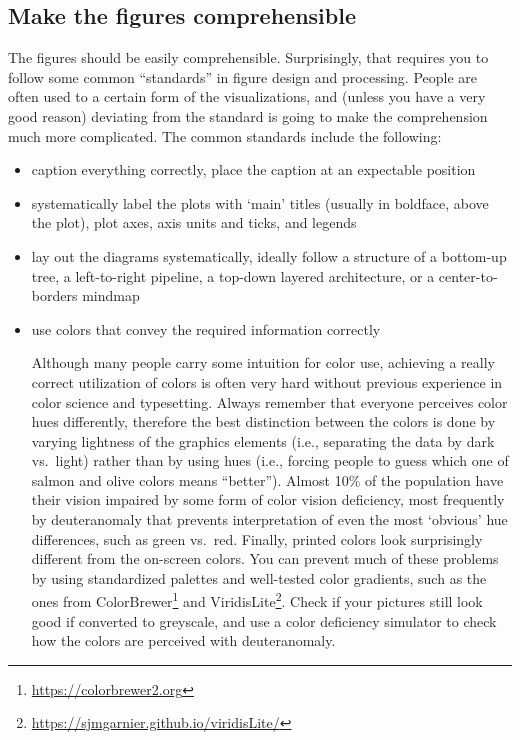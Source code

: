 \subsection{Make the figures comprehensible}
The figures should be easily comprehensible. Surprisingly, that requires you to follow some common ``standards'' in figure design and processing. People are often used to a certain form of the visualizations, and (unless you have a very good reason) deviating from the standard is going to make the comprehension much more complicated. The common standards include the following:
\begin{itemize}
  \item caption everything correctly, place the caption at an expectable position
  \item systematically label the plots with `main' titles (usually in boldface, above the plot), plot axes, axis units and ticks, and legends
  \item lay out the diagrams systematically, ideally follow a structure of a bottom-up tree, a left-to-right pipeline, a top-down layered architecture, or a center-to-borders mindmap
  \item {use colors that convey the required information correctly \par\footnotesize Although many people carry some intuition for color use, achieving a really correct utilization of colors is often very hard without previous experience in color science and typesetting. Always remember that everyone perceives color hues differently, therefore the best distinction between the colors is done by varying lightness of the graphics elements (i.e., separating the data by dark vs.~light) rather than by using hues (i.e., forcing people to guess which one of salmon and olive colors means ``better''). Almost 10\% of the population have their vision impaired by some form of color vision deficiency, most frequently by deuteranomaly that prevents interpretation of even the most `obvious' hue differences, such as green vs.~red. Finally, printed colors look surprisingly different from the on-screen colors. You can prevent much of these problems by using standardized palettes and well-tested color gradients, such as the ones from ColorBrewer\footnote{\url{https://colorbrewer2.org}} and ViridisLite\footnote{\url{https://sjmgarnier.github.io/viridisLite/}}. Check if your pictures still look good if converted to greyscale, and use a color deficiency simulator to check how the colors are perceived with deuteranomaly.}
\end{itemize}

